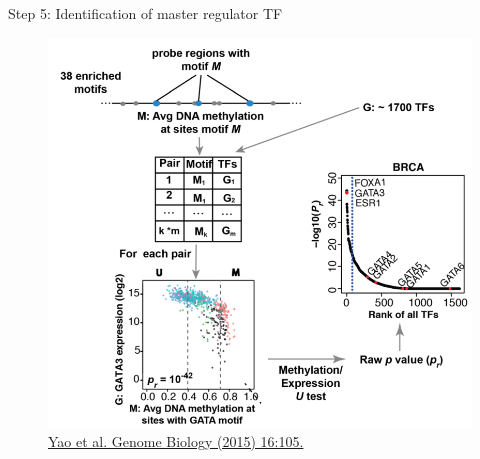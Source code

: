 \documentclass[slidestop,compress,11pt,xcolor=dvipsnames]{beamer}
\begin{document}



\begin{frame}{Step 5: Identification of master regulator TF}
\vspace*{-0.5cm}
 \begin{figure}
  \centering
  \includegraphics[width=0.7\linewidth]{ELMER/tfrank.png}{\tiny{\\\href{https://genomebiology.biomedcentral.com/articles/10.1186/s13059-015-0668-3}{Yao et al. Genome Biology (2015) 16:105.}}}
 \end{figure}
\end{frame}

\end{document}
